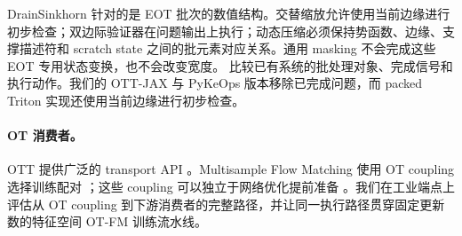 DrainSinkhorn 针对的是 EOT 批次的数值结构。交替缩放允许使用当前边缘进行初步检查；双边际验证器在问题输出上执行；动态压缩必须保持势函数、边缘、支撑描述符和 scratch state 之间的批元素对应关系。通用 masking 不会完成这些 EOT 专用状态变换，也不会改变宽度。 比较已有系统的批处理对象、完成信号和执行动作。我们的 OTT-JAX 与 PyKeOps 版本移除已完成问题，而 packed Triton 实现还使用当前边缘进行初步检查。

\paragraph{OT 消费者。}
OTT 提供广泛的 transport API \citep{cuturi2022ott}。Multisample Flow Matching 使用 OT coupling 选择训练配对 \citep{pooladian2023multisample}；这些 coupling 可以独立于网络优化提前准备 \citep{zhang2025large}。我们在工业端点上评估从 OT coupling 到下游消费者的完整路径，并让同一执行路径贯穿固定更新数的特征空间 OT-FM 训练流水线。


